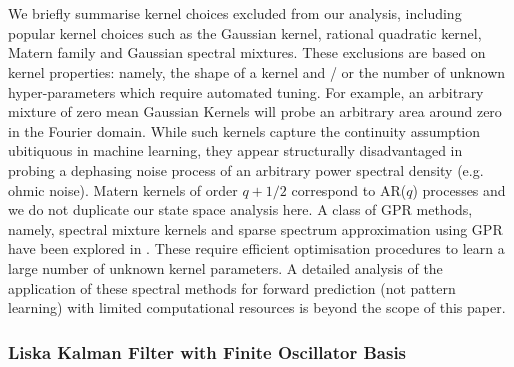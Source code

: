 \\
\\
We briefly summarise kernel choices excluded from our analysis, including popular kernel choices such as the Gaussian kernel, rational quadratic kernel, Matern family and Gaussian spectral mixtures. These exclusions are based on kernel properties: namely, the shape of a kernel and / or the number of unknown hyper-parameters which require automated tuning. For example, an arbitrary mixture of zero mean Gaussian Kernels will probe an arbitrary area around zero in the Fourier domain. While such kernels capture the continuity assumption ubitiquous in machine learning, they appear structurally disadvantaged in probing a dephasing noise process of an arbitrary power spectral density (e.g. ohmic noise). Matern kernels of order $q + 1/2$ correspond to AR($q$) processes and we do not duplicate our state space analysis here. A class of GPR methods, namely, spectral mixture kernels and sparse spectrum approximation using GPR have been explored in \cite{wilson2013, quia2010}. These require efficient optimisation procedures to learn a large number of unknown kernel parameters. A detailed analysis of the application of these spectral methods for forward prediction (not pattern learning) with limited computational resources is beyond the scope of this paper.  

\subsubsection{Liska Kalman Filter with Finite Oscillator Basis}

